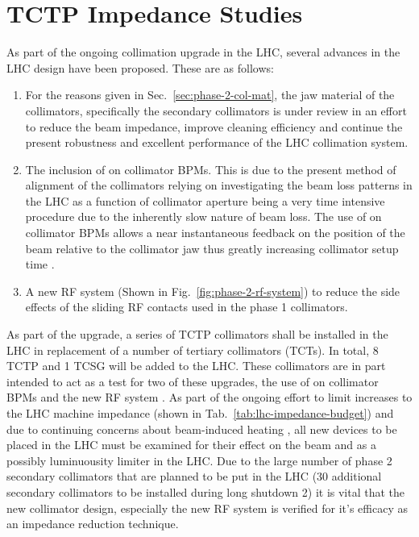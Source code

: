 \section{TCTP Impedance Studies}
\label{sec:tctp}

As part of the ongoing collimation upgrade in the LHC, several advances in the LHC design have been proposed. These are as follows:

\begin{enumerate}
\item{For the reasons given in Sec.~\ref{sec:phase-2-col-mat}, the jaw material of the collimators, specifically the secondary collimators is under review in an effort to reduce the beam impedance, improve cleaning efficiency and continue the present robustness and excellent performance of the LHC collimation system.}
\item{The inclusion of on collimator BPMs. This is due to the present method of alignment of the collimators relying on investigating the beam loss patterns in the LHC as a function of collimator aperture being a very time intensive procedure due to the inherently slow nature of beam loss. The use of on collimator BPMs allows a near instantaneous feedback on the position of the beam relative to the collimator jaw thus greatly increasing collimator setup time \cite{Valentino:ColAlignment, Valentino:BPM}.}
\item{A new RF system (Shown in Fig.~\ref{fig:phase-2-rf-system}) to reduce the side effects of the sliding RF contacts used in the phase 1 collimators.}
\end{enumerate}

As part of the upgrade, a series of TCTP collimators shall be installed in the LHC in replacement of a number of tertiary collimators (TCTs). In total, 8 TCTP and 1 TCSG will be added to the LHC. These collimators are in part intended to act as a test for two of these upgrades, the use of on collimator BPMs and the new RF system \cite{Dallocchio:ColBPM}. As part of the ongoing effort to limit increases to the LHC machine impedance (shown in Tab.~\ref{tab:lhc-impedance-budget}) and due to continuing concerns about beam-induced heating \cite{Salvant:Heating, Métral:Heating}, all new devices to be placed in the LHC must be examined for their effect on the beam and as a possibly luminuousity limiter in the LHC. Due to the large number of phase 2 secondary collimators that are planned to be put in the LHC (30 additional secondary collimators to be installed during long shutdown 2) it is vital that the new collimator design, especially the new RF system is verified for it's efficacy as an impedance reduction technique.  

